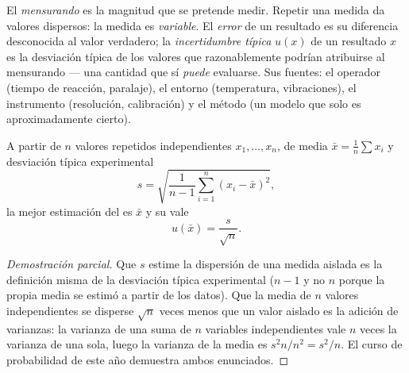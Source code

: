 \begin{definition}\label{def:b1:units-dimensions:uncertainty}
El \emph{mensurando} es la magnitud que se pretende medir. Repetir una
medida da valores dispersos: la medida es \emph{variable}. El
\emph{error} de un resultado es su diferencia desconocida al valor
verdadero; la \emph{incertidumbre típica} $u(x)$ de un resultado $x$ es la
desviación típica de los valores que razonablemente podrían atribuirse al
mensurando --- una cantidad que sí \emph{puede} evaluarse. Sus fuentes: el
operador (tiempo de reacción, paralaje), el entorno (temperatura,
vibraciones), el instrumento (resolución, calibración) y el método (un
modelo que solo es aproximadamente cierto).
\end{definition}

\begin{proposition}\label{prop:b1:units-dimensions:typeA}
A partir de $n$ valores repetidos independientes $x_1, \dots, x_n$, de
media $\bar x = \frac1n \sum x_i$ y desviación típica experimental
\[
s = \sqrt{\frac{1}{n-1}\sum_{i=1}^n (x_i - \bar x)^2},
\]
la mejor estimación del  es $\bar x$ y su 
vale
\[
u(\bar x) = \frac{s}{\sqrt n} .
\]
\end{proposition}

\begin{proof}[Demostración parcial]
Que $s$ estime la dispersión de una medida aislada es la definición misma
de la desviación típica experimental ($n - 1$ y no $n$ porque la propia
media se estimó a partir de los datos). Que la media de $n$ valores
independientes se disperse $\sqrt n$ veces menos que un valor aislado es
la adición de varianzas: la varianza de una suma de $n$ variables
independientes vale $n$ veces la varianza de una sola, luego la varianza
de la media es $s^2 n / n^2 = s^2/n$. El curso de probabilidad de este año
demuestra ambos enunciados.
\end{proof}


